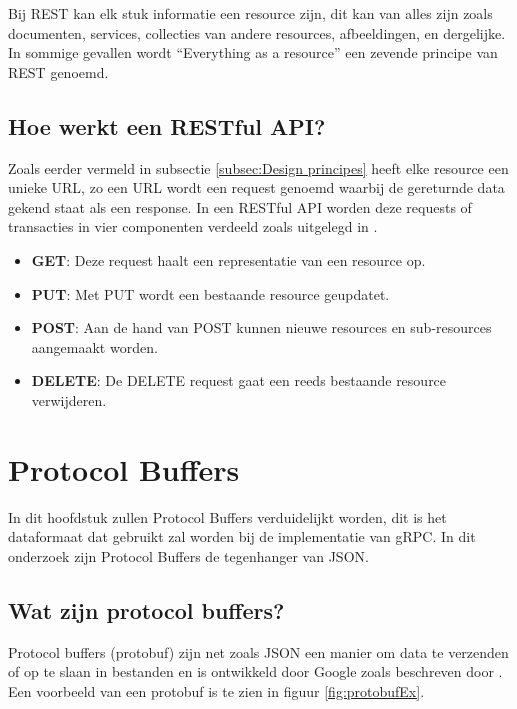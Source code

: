 Bij REST kan elk stuk informatie een resource zijn, dit kan van alles zijn zoals documenten, services, collecties van andere resources, afbeeldingen, en dergelijke. In sommige gevallen wordt “Everything as a resource”  een zevende principe van REST genoemd. 

\subsection{Hoe werkt een RESTful API?}
\label{subsec:Hoe werkt een RESTful API?}

Zoals eerder vermeld in subsectie \ref{subsec:Design principes} heeft elke resource een unieke URL, zo een URL wordt een request genoemd waarbij de gereturnde data gekend staat als een response. In een RESTful API worden deze requests of transacties in vier componenten verdeeld zoals uitgelegd in \textcite{Karine2020}.

\begin{itemize}
    \item \textbf{GET}: Deze request haalt een representatie van een resource op.
    \item \textbf{PUT}: Met PUT wordt een bestaande resource geupdatet.
    \item \textbf{POST}: Aan de hand van POST kunnen nieuwe resources en sub-resources aangemaakt worden.
    \item \textbf{DELETE}: De DELETE request gaat een reeds bestaande resource verwijderen.
\end{itemize}

\section{Protocol Buffers}
\label{sec:Protocol Buffers}

 In dit hoofdstuk zullen Protocol Buffers verduidelijkt worden, dit is het dataformaat dat gebruikt zal worden bij de implementatie van gRPC. In dit onderzoek zijn Protocol Buffers de tegenhanger van JSON.

\subsection{Wat zijn protocol buffers?}
\label{subsec:Wat zijn protocol buffers?}

Protocol buffers (protobuf) zijn net zoals JSON een manier om data te verzenden of op te slaan in bestanden en is ontwikkeld door Google zoals beschreven door \textcite{Kurian2020}. Een voorbeeld van een protobuf is te zien in figuur \ref{fig:protobufEx}.

